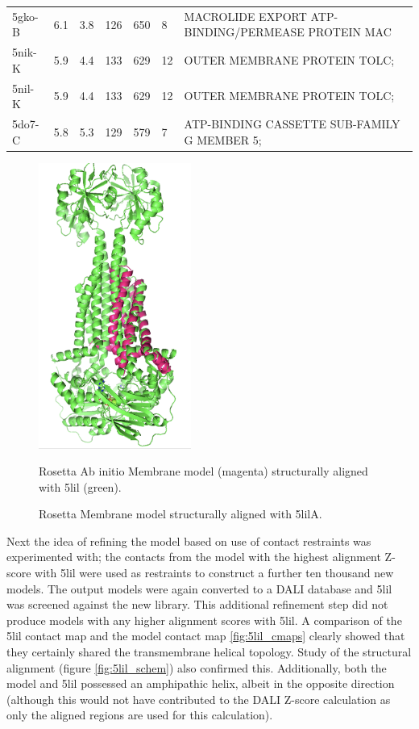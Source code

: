 \begin{table}
{\begin{tabular}{lllllll}
\rowcolor{cyan} 5gko-B               & 6.1     & 3.8  & 126  & 650  & 8    & MACROLIDE EXPORT ATP-BINDING/PERMEASE PROTEIN MAC  \\
\rowcolor[rgb]{0.137,1,0.769} 5nik-K & 5.9     & 4.4  & 133  & 629  & 12   & OUTER MEMBRANE PROTEIN TOLC;                       \\
\rowcolor{cyan} 5nil-K               & 5.9     & 4.4  & 133  & 629  & 12   & OUTER MEMBRANE PROTEIN TOLC;                       \\
\rowcolor[rgb]{0.137,1,0.769} 5do7-C & 5.8     & 5.3  & 129  & 579  & 7    & ATP-BINDING CASSETTE SUB-FAMILY G MEMBER 5;       
\end{tabular}
}
\label{table:abc}
\end{table}

\begin{figure}[th!]
    \centering
    \includegraphics[width=50mm, scale =0.5]{Results/5lil_super_fig.png}
    \caption{Rosetta Membrane model structurally aligned with 5lilA.}
    \label{fig:5lil_super}
    \small
    Rosetta Ab initio Membrane model (magenta) structurally aligned with 5lil (green).
\end{figure}

Next the idea of refining the model based on use of contact restraints was experimented with; the contacts from the model with the highest alignment Z-score with 5lil were used as restraints to construct a further ten thousand new models.  The output models were again converted to a DALI database and 5lil was screened against the new library.  This additional refinement step did not produce models with any higher alignment scores with 5lil.  A comparison of the 5lil contact map and the model contact map \ref{fig:5lil_cmaps} clearly showed that they certainly shared the transmembrane helical topology.  Study of the structural alignment (figure \ref{fig:5lil_schem}) also confirmed this. Additionally, both the model and 5lil possessed an amphipathic helix, albeit in the opposite direction (although this would not have contributed to the DALI Z-score calculation as only the aligned regions are used for this calculation).\\

